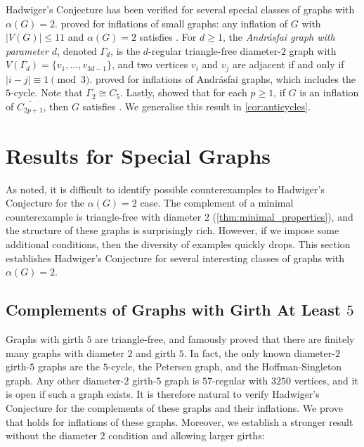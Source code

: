 \documentclass[11pt]{article}
\numberwithin{equation}{section}
\theoremstyle{plain}
\theoremstyle{definition}
\renewcommand{\geq}{\geqslant}
\renewcommand{\leq}{\leqslant}
\newcommand{\defn}[1]{\textcolor{green!50!black}{\textit{#1}}}
\begin{document}
Hadwiger's Conjecture has been verified for several special classes of graphs with $\alpha(G) = 2$. \citet{PST03} proved  for inflations of small graphs: any inflation of $G$ with $|V(G)| \leq 11$ and $\alpha(G) = 2$ satisfies .
For $d \geq 1$, the \defn{Andr\'asfai graph with parameter $d$}, denoted \defn{$\Gamma_d$}, is the $d$-regular triangle-free diameter-$2$ graph with $V(\Gamma_d) = \{v_1, \dots, v_{3d-1}\}$, and two vertices $v_i$ and $v_j$ are adjacent if and only if $|i - j| \equiv 1 \pmod{3}$. \citet{PST03} proved \footnotemark{} for inflations of Andr\'asfai graphs, which includes the $5$-cycle.
Note that $\Gamma_2 \cong C_5$.
Lastly, \citet{PPT16} showed that for each $p \geq 1$, if $G$ is an inflation of $\overline{C_{2p+1}}$, then $G$ satisfies . We generalise this result in \cref{cor:anticycles}.

\section{Results for Special Graphs}
\label{section:results_special}
As \citet{Blasiak07} noted, it is difficult to identify possible counterexamples to Hadwiger's Conjecture for the $\alpha(G) = 2$ case. The complement of a minimal counterexample is triangle-free with diameter $2$ (\cref{thm:minimal_properties}), and the structure of these graphs is surprisingly rich. However, if we impose some additional conditions, then the diversity of examples quickly drops.
This section establishes Hadwiger's Conjecture for several interesting classes of graphs with $\alpha(G) = 2$.

\subsection{\boldmath Complements of Graphs with Girth At Least \texorpdfstring{$5$}{5}}
\label{ss:girth5}
Graphs with girth $5$ are triangle-free, and \citet{HS60} famously proved that there are finitely many graphs with diameter $2$ and girth $5$. In fact, the only known diameter-$2$ girth-$5$ graphs are the $5$-cycle, the Petersen graph, and the Hoffman-Singleton graph.
Any other diameter-$2$ girth-$5$ graph is $57$-regular with $3250$ vertices, and it is open if such a graph exists.
It is therefore natural to verify Hadwiger's Conjecture for the complements of these graphs and their inflations. We prove that  holds for inflations of these graphs. Moreover, we establish a stronger result without the diameter $2$ condition and allowing larger girths:
\end{document}
